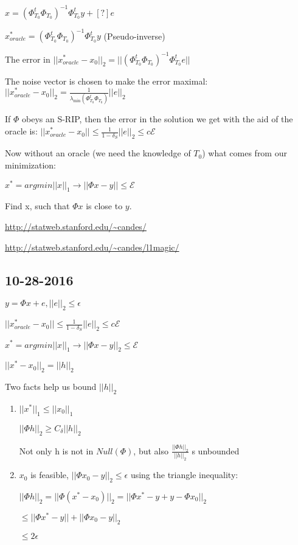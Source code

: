\documentclass[12pt,letterpaper]{report}
\begin{document}
$x = (\Phi_{T_0}^t \Phi_{T_0})^{-1} \Phi_{T_0}^t y + [?]e$

$x_{oracle}^* = (\Phi_{T_0}^t \Phi_{T_0})^{-1}\Phi_{T_0}^t y$ (Pseudo-inverse)

The error in $||x_{oracle}^* - x_0||_2 = ||(\Phi_{T_0}^t \Phi_{T_0})^{-1} \Phi_{T_0}^t e||$

The noise vector is chosen to make the error maximal: $||x_{oracle}^* - x_0||_2 = \frac{1}{\lambda_{\min}(\Phi_{T_0}^t \Phi_{T_0})}||e||_2$

If $\Phi$ obeys an S-RIP, then the error in the solution we get with the aid of the oracle is: $||x_{oracle}^* - x_0|| \leq \frac{1}{1 - \delta_S}||e||_2 \leq c  \mathcal{E}$

Now without an oracle (we need the knowledge of $T_0$) what comes from our minimization:

$x^* = argmin||x||_1 \rightarrow ||\Phi x - y|| \leq \mathcal{E}$

Find x, such that $\Phi x$ is close to $y$.

\url{http://statweb.stanford.edu/~candes/}

\url{http://statweb.stanford.edu/~candes/l1magic/}


\subsection*{10-28-2016}

$y = \Phi x + e, ||e||_2 \leq \epsilon$

$||x_{oracle}^* - x_0|| \leq \frac{1}{1 - \delta_S}||e||_2 \leq c  \mathcal{E}$

$x^* = argmin||x||_1 \rightarrow ||\Phi x - y||_2 \leq \mathcal{E}$

$||x^* - x_0||_2 = ||h||_2$

Two facts help us bound $||h||_2$

\begin{enumerate}
\item $||x^*||_1 \leq ||x_0||_1$

$||\Phi h ||_2 \geq C_\delta ||h||_2$

Not only h is not in $Null(\Phi)$, but also $\frac{||\Phi h||_2}{||h||_2}$ s unbounded

\item $x_0$ is feasible, $||\Phi x_0 - y||_2 \leq \epsilon$ using the triangle inequality:

$||\Phi h||_2 = ||\Phi (x^* - x_0)||_2 = ||\Phi x^* - y + y - \Phi x_0||_2$

$\leq ||\Phi x^* - y|| + ||\Phi x_0 - y||_2  $

$\leq 2 \epsilon$

\end{enumerate}
\end{document}
